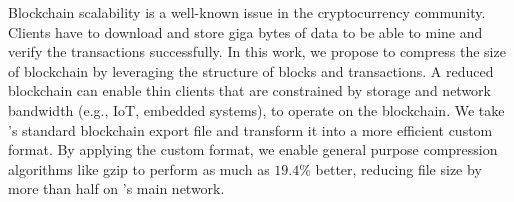 Blockchain scalability is a well-known issue in the cryptocurrency community.
Clients have to download and store giga bytes of data to be able to mine and verify the transactions successfully.
In this work, we propose to compress the size of \eth{} blockchain by leveraging the structure of blocks and transactions.
A reduced blockchain can enable thin clients  that are constrained by storage and network bandwidth (e.g., IoT, embedded systems),
to operate on the \eth{} blockchain. We take \eth{}'s standard blockchain export file and transform it into a more
efficient custom format. By applying the custom format, we enable general purpose compression algorithms like gzip to perform
as much as $19.4\%$ better, reducing file size by more than half on \eth{}'s main network.
